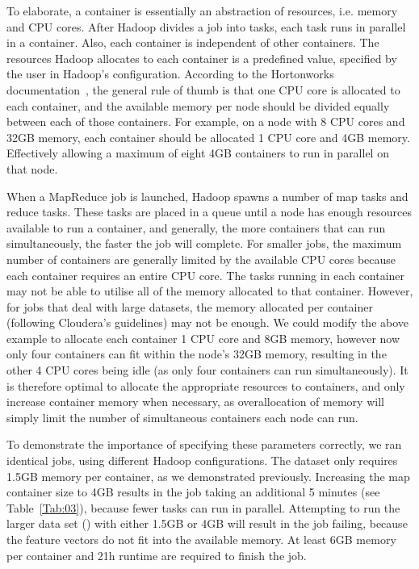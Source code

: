 \documentclass{bioinfo}
\begin{document}
To elaborate, a container is essentially an abstraction of resources, i.e. memory and CPU cores. 
After Hadoop divides a job into tasks, each task runs in parallel in a container. Also, each container is independent of other containers.
The resources Hadoop allocates to each container is a predefined value, specified by the user in Hadoop's configuration. 
According to the Hortonworks documentation~\citep{Horton2013}, the general rule of thumb is that one CPU core is allocated to each container, and the available memory per node should be divided equally between each of those containers. 
For example, on a node with 8 CPU cores and 32GB memory, each container should be allocated 1 CPU core and 4GB memory. Effectively allowing a maximum of eight 4GB containers to run in parallel on that node.

When a MapReduce job is launched, Hadoop spawns a number of map tasks and reduce tasks. 
These tasks are placed in a queue until a node has enough resources available to run a container, and generally, the more containers that can run simultaneously, the faster the job will complete.
For smaller jobs, the maximum number of containers are generally limited by the available CPU cores because each container requires an entire CPU core. The tasks running in each container may not be able to utilise all of the memory allocated to that container.
However, for jobs that deal with large datasets, the memory allocated per container (following Cloudera's guidelines) may not be enough.
We could modify the above example to allocate each container 1 CPU core and 8GB memory, however now only four containers can fit within the node's 32GB memory, resulting in the other 4 CPU cores being idle (as only four containers can run simultaneously). 
It is therefore optimal to allocate the appropriate resources to containers, and only increase container memory when necessary, as overallocation of memory will simply limit the number of simultaneous containers each node can run.

To demonstrate the importance of specifying these parameters correctly, we ran identical jobs, using different Hadoop configurations. 
The \OnePhaseone{} dataset only requires 1.5GB memory per container, as we demonstrated previously.
Increasing the map container size to 4GB results in the job taking an additional 5 minutes (see Table~\ref{Tab:03}), because fewer tasks can run in parallel. 
Attempting to run the larger data set (\FullPhasethree{}) with either 1.5GB or 4GB will result in the job failing, because the feature vectors do not fit into the available memory. 
At least 6GB memory per container and 21h runtime are required to finish the job. 
\end{document}
